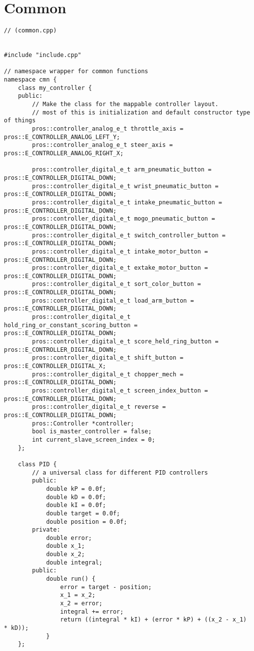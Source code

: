 \section*{Common}
\begin{verbatim}
// (common.cpp)


#include "include.cpp"

// namespace wrapper for common functions
namespace cmn {
    class my_controller {
    public:
        // Make the class for the mappable controller layout. 
        // most of this is initialization and default constructor type of things
        pros::controller_analog_e_t throttle_axis = pros::E_CONTROLLER_ANALOG_LEFT_Y;
        pros::controller_analog_e_t steer_axis = pros::E_CONTROLLER_ANALOG_RIGHT_X;

        pros::controller_digital_e_t arm_pneumatic_button = pros::E_CONTROLLER_DIGITAL_DOWN;
        pros::controller_digital_e_t wrist_pneumatic_button = pros::E_CONTROLLER_DIGITAL_DOWN;
        pros::controller_digital_e_t intake_pneumatic_button = pros::E_CONTROLLER_DIGITAL_DOWN;
        pros::controller_digital_e_t mogo_pneumatic_button = pros::E_CONTROLLER_DIGITAL_DOWN;
        pros::controller_digital_e_t switch_controller_button = pros::E_CONTROLLER_DIGITAL_DOWN;
        pros::controller_digital_e_t intake_motor_button = pros::E_CONTROLLER_DIGITAL_DOWN;
        pros::controller_digital_e_t extake_motor_button = pros::E_CONTROLLER_DIGITAL_DOWN;
        pros::controller_digital_e_t sort_color_button = pros::E_CONTROLLER_DIGITAL_DOWN;
        pros::controller_digital_e_t load_arm_button = pros::E_CONTROLLER_DIGITAL_DOWN;
        pros::controller_digital_e_t hold_ring_or_constant_scoring_button = pros::E_CONTROLLER_DIGITAL_DOWN;
        pros::controller_digital_e_t score_held_ring_button = pros::E_CONTROLLER_DIGITAL_DOWN;
        pros::controller_digital_e_t shift_button = pros::E_CONTROLLER_DIGITAL_X;
        pros::controller_digital_e_t chopper_mech = pros::E_CONTROLLER_DIGITAL_DOWN;
        pros::controller_digital_e_t screen_index_button = pros::E_CONTROLLER_DIGITAL_DOWN;
        pros::controller_digital_e_t reverse = pros::E_CONTROLLER_DIGITAL_DOWN;
        pros::Controller *controller;
        bool is_master_controller = false;
        int current_slave_screen_index = 0;
    };

    class PID {
        // a universal class for different PID controllers
        public:
            double kP = 0.0f;
            double kD = 0.0f;
            double kI = 0.0f;
            double target = 0.0f;
            double position = 0.0f;
        private:
            double error;
            double x_1;
            double x_2;
            double integral;
        public:
            double run() {
                error = target - position;
                x_1 = x_2;
                x_2 = error;
                integral += error;
                return ((integral * kI) + (error * kP) + ((x_2 - x_1) * kD));
            }
    };


\end{verbatim}
